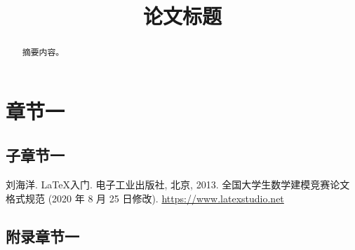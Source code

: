 \documentclass{cumcmthesis}
\title{论文标题}
\begin{document}
    \maketitle

    \begin{abstract}
        摘要内容。

    \end{abstract}

    \section{章节一}
        \subsection{子章节一}

    \begin{thebibliography}{9}
        刘海洋.
        \newblock \LaTeX {}入门\allowbreak[J].
        \newblock 电子工业出版社, 北京, 2013.
        全国大学生数学建模竞赛论文格式规范 (2020 年 8 月 25 日修改).
         \url{https://www.latexstudio.net}
    \end{thebibliography}

    \newpage

    \begin{appendices}
        \section{附录章节一}
    \end{appendices}
\end{document}
